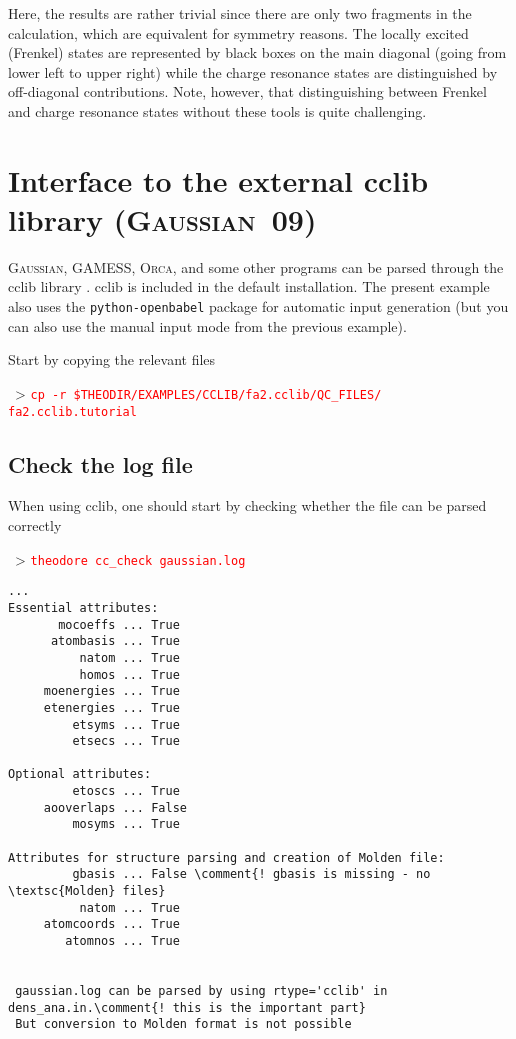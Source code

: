 \documentclass[DIV=12,headings=normal]{scrartcl}
\newcommand{\comment}[1]{\textcolor{blue}{#1}}
\newcommand{\redl}[1]{{\textcolor{red}{\texttt{#1}}}}
\newcommand{\comm}[1]{
\small
~> \redl{#1}
\normalsize
}
\begin{document}
Here, the results are rather trivial since there are only two fragments in the calculation, which are equivalent for symmetry reasons.
The locally excited (Frenkel) states are represented by black boxes on the main diagonal (going from lower left to upper right) while the charge resonance states are distinguished by off-diagonal contributions.
Note, however, that distinguishing between Frenkel and charge resonance states without these tools is quite challenging.

\section{Interface to the external cclib library (\textsc{Gaussian~09})}
\textsc{Gaussian}, GAMESS, \textsc{Orca}, and some other programs can be parsed through the cclib library \cite{cclib}.
cclib is included in the default installation.
The present example also uses the \texttt{python-openbabel} package for automatic input generation (but you can also use the manual input mode from the previous example).

Start by copying the relevant files

\comm{cp -r \$THEODIR/EXAMPLES/CCLIB/fa2.cclib/QC\_FILES/ fa2.cclib.tutorial}

\subsection{Check the log file}
When using cclib, one should start by checking whether the file can be parsed correctly

\comm{theodore cc\_check gaussian.log}

\scriptsize
\begin{Verbatim}[commandchars=\\\{\}]
...
Essential attributes:
       mocoeffs ... True
      atombasis ... True
          natom ... True
          homos ... True
     moenergies ... True
     etenergies ... True
         etsyms ... True
         etsecs ... True

Optional attributes:
         etoscs ... True
     aooverlaps ... False
         mosyms ... True

Attributes for structure parsing and creation of Molden file:
         gbasis ... False \comment{! gbasis is missing - no \textsc{Molden} files}
          natom ... True
     atomcoords ... True
        atomnos ... True


 gaussian.log can be parsed by using rtype='cclib' in dens_ana.in.\comment{! this is the important part}
 But conversion to Molden format is not possible
\end{Verbatim}
\normalsize
\end{document}

